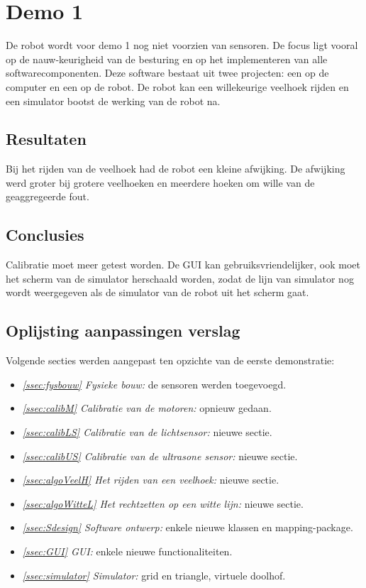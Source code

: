 \documentclass[tt3]{penoverslag}
\begin{document}
\newpage
\makeappendix


\section{Demo 1} %
\label{Asec:demo1}
De robot wordt voor demo 1 nog niet voorzien van sensoren. De focus ligt vooral op de nauw-keurigheid van de besturing en op het implementeren van alle softwarecomponenten. Deze software bestaat uit twee projecten: een op de computer en een op de robot. De robot kan een willekeurige veelhoek rijden en een simulator bootst de werking van de robot na.

\subsection{Resultaten} %
\label{Assec:result1}
Bij het rijden van de veelhoek had de robot een kleine afwijking. De afwijking werd groter bij grotere veelhoeken en meerdere hoeken om wille van de geaggregeerde fout.

\subsection{Conclusies} %
\label{Assec:conc1}
Calibratie moet meer getest worden. De GUI kan gebruiksvriendelijker, ook moet het scherm van de simulator herschaald worden, zodat de lijn van simulator nog wordt weergegeven als de simulator van de robot uit het scherm gaat.

\subsection{Oplijsting aanpassingen verslag} %
\label{Assec:aanp1}
Volgende secties werden aangepast ten opzichte van de eerste demonstratie:

\begin{itemize}
\item \textit{\ref{ssec:fysbouw} Fysieke bouw:} de sensoren werden toegevoegd.
\item \textit{\ref{ssec:calibM} Calibratie van de motoren:} opnieuw gedaan.
\item \textit{\ref{ssec:calibLS} Calibratie van de lichtsensor:} nieuwe sectie.
\item \textit{\ref{ssec:calibUS} Calibratie van de ultrasone sensor:} nieuwe sectie.
\item \textit{\ref{ssec:algoVeelH} Het rijden van een veelhoek:} nieuwe sectie.
\item \textit{\ref{ssec:algoWitteL} Het rechtzetten op een witte lijn:} nieuwe sectie.
\item \textit{\ref{ssec:Sdesign} Software ontwerp:} enkele nieuwe klassen en mapping-package.
\item \textit{\ref{ssec:GUI} GUI:} enkele nieuwe functionaliteiten.
\item \textit{\ref{ssec:simulator} Simulator:} grid en triangle, virtuele doolhof.
\end{itemize}
\end{document}
